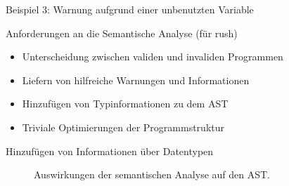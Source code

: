 \begin{frame}{Beispiel 3: Warnung aufgrund einer unbenutzten Variable}
	\begin{minipage}{.5\textwidth}
	\end{minipage}%
	\begin{minipage}{.5\textwidth}
	\end{minipage}
\end{frame}

\begin{frame}{Anforderungen an die Semantische Analyse (für rush)}
	\begin{itemize}
		\item Unterscheidung zwischen validen und invaliden Programmen
		\item Liefern von hilfreiche Warnungen und Informationen
		\item Hinzufügen von Typinformationen zu dem AST
		\item Triviale Optimierungen der Programmstruktur
	\end{itemize}
\end{frame}

\begin{frame}{Hinzufügen von Informationen über Datentypen }
	\begin{figure}[h]
		\begin{adjustbox}{max totalsize={\textwidth}{!},center}
        \end{adjustbox}
		\caption{Auswirkungen der semantischen Analyse auf den AST.}\label{fig:analysis_tree_conv}
	\end{figure}
\end{frame}
